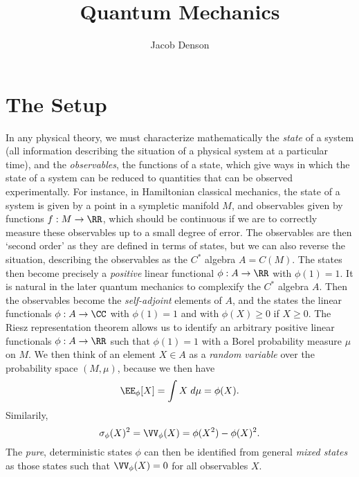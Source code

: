 

\title{Quantum Mechanics}
\author{Jacob Denson}



\chapter{The Setup}

In any physical theory, we must characterize mathematically the \emph{state} of a system (all information describing the situation of a physical system at a particular time), and the \emph{observables}, the functions of a state, which give ways in which the state of a system can be reduced to quantities that can be observed experimentally. For instance, in Hamiltonian classical mechanics, the state of a system is given by a point in a sympletic manifold $M$, and observables given by functions $f: M \to \RR$, which should be continuous if we are to correctly measure these observables up to a small degree of error. The observables are then `second order' as they are defined in terms of states, but we can also reverse the situation, describing the observables as the $C^*$ algebra $A = C(M)$. The states then become precisely a \emph{positive} linear functional $\phi: A \to \RR$ with $\phi(1) = 1$. It is natural in the later quantum mechanics to complexify the $C^*$ algebra $A$. Then the observables become the \emph{self-adjoint} elements of $A$, and the states the linear functionals $\phi: A \to \CC$ with $\phi(1) = 1$ and with $\phi(X) \geq 0$ if $X \geq 0$. The Riesz representation theorem allows us to identify an arbitrary positive linear functionals $\phi: A \to \RR$ such that $\phi(1) = 1$ with a Borel probability measure $\mu$ on $M$. We then think of an element $X \in A$ as a \emph{random variable} over the probability space $(M,\mu)$, because we then have
%
\[ \EE_\phi[X] = \int X\; d\mu = \phi(X). \]
%
Similarily,
%
\[ \sigma_\phi(X)^2 = \VV_\phi(X) = \phi(X^2) - \phi(X)^2. \]
%
The \emph{pure}, deterministic states $\phi$ can then be identified from general \emph{mixed states} as those states such that $\VV_\phi(X) = 0$ for all observables $X$.



